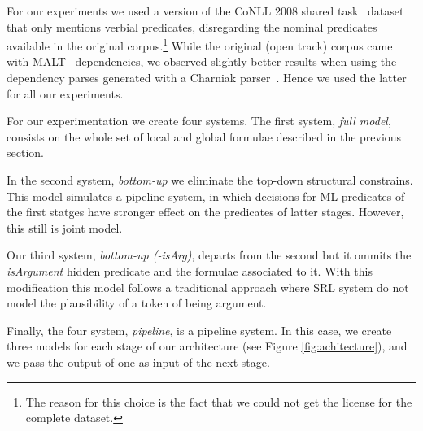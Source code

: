 
For our experiments we used a version of the CoNLL 2008 shared task~\citep{surdeanu08conll} dataset that only mentions verbial predicates, disregarding the nominal predicates available in the original corpus.\footnote{The reason for this choice is the fact that we could not get the license for the complete dataset.} While the original (open track) corpus came with MALT~\citep{nivre2007mli} dependencies, we observed slightly better results when using the dependency parses generated with a Charniak parser~\citep{charniak00amaximum}. Hence we used the latter for all our experiments.


For our experimentation we create four systems. The first system, \emph{full model}, consists on the whole set of local and global formulae described in the previous section. 

In the second system, \emph{bottom-up} we eliminate the top-down structural constrains. This model simulates a  
pipeline system, in which decisions for ML predicates of the first statges have
stronger effect on the predicates of latter stages. However, this still is
joint model. 

Our third system, \emph{bottom-up (-isArg)}, departs from the second but it ommits the \emph{isArgument} hidden predicate and the formulae associated to it. With this modification this model follows a traditional approach where SRL system do not model the plausibility of a token of being argument.

Finally, the four system, \emph{pipeline}, is a pipeline system. In this case, we
create three models for each stage of our architecture (see Figure \ref{fig:achitecture}), and we pass the output of one as input of the next stage.
